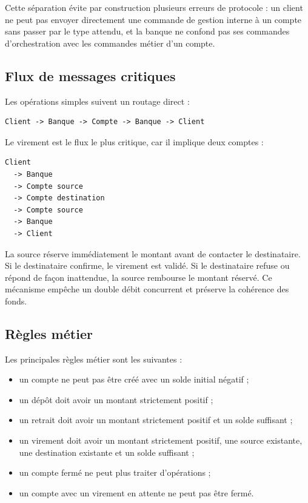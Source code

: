 \documentclass[11pt,a4paper]{article}
\begin{document}
Cette séparation évite par construction plusieurs erreurs de protocole : un client ne peut pas envoyer directement une commande de gestion interne à un compte sans passer par le type attendu, et la banque ne confond pas ses commandes d'orchestration avec les commandes métier d'un compte.

\subsection{Flux de messages critiques}

Les opérations simples suivent un routage direct :

\begin{lstlisting}
Client -> Banque -> Compte -> Banque -> Client
\end{lstlisting}

Le virement est le flux le plus critique, car il implique deux comptes :

\begin{lstlisting}
Client
  -> Banque
  -> Compte source
  -> Compte destination
  -> Compte source
  -> Banque
  -> Client
\end{lstlisting}

La source réserve immédiatement le montant avant de contacter le destinataire. Si le destinataire confirme, le virement est validé. Si le destinataire refuse ou répond de façon inattendue, la source rembourse le montant réservé. Ce mécanisme empêche un double débit concurrent et préserve la cohérence des fonds.

\subsection{Règles métier}

Les principales règles métier sont les suivantes :
\begin{itemize}[leftmargin=*]
  \item un compte ne peut pas être créé avec un solde initial négatif ;
  \item un dépôt doit avoir un montant strictement positif ;
  \item un retrait doit avoir un montant strictement positif et un solde suffisant ;
  \item un virement doit avoir un montant strictement positif, une source existante, une destination existante et un solde suffisant ;
  \item un compte fermé ne peut plus traiter d'opérations ;
  \item un compte avec un virement en attente ne peut pas être fermé.
\end{itemize}
\end{document}
